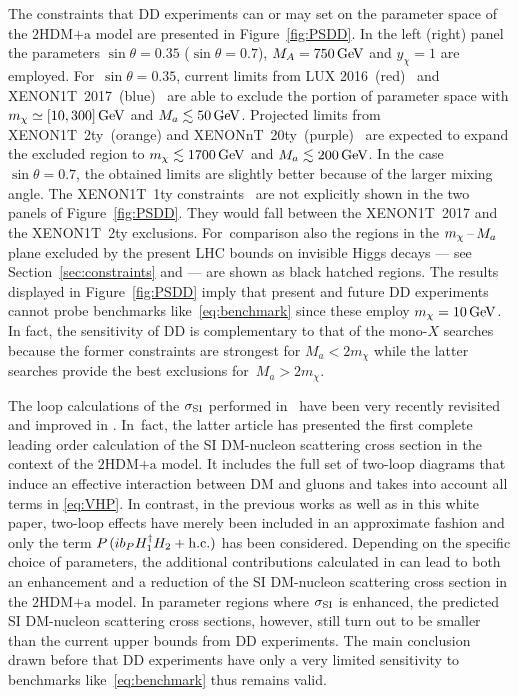 \documentclass[a4paper, 11pt,notoc]{article}
\newcommand{\hdma}{\ensuremath{\textrm{2HDM+a}}\xspace}
\begin{document}
The constraints that DD experiments can or may set on the parameter space of the \hdma model are presented in Figure~\ref{fig:PSDD}. In the left (right) panel the parameters $\sin \theta = 0.35$ ($\sin \theta = 0.7$), $M_A = 750 \, {\rm GeV}$ and $y_\chi = 1$ are employed. For~$\sin \theta = 0.35$,  current limits from LUX 2016~(red)~\cite{Akerib:2016vxi} and  XENON1T~2017~(blue)~\cite{Aprile:2017iyp} are able to exclude the portion of parameter space with $m_\chi \simeq [10, 300 ]\, {\rm GeV}$ and $M_a \lesssim 50 \, {\rm GeV}$. Projected limits from XENON1T~2ty~(orange) and XENONnT~20ty~(purple)~\cite{Aprile:2015uzo} are expected to expand the excluded region to $m_\chi \lesssim 1700 \, {\rm GeV}$ and $M_a \lesssim 200 \, {\rm GeV}$. In the case $\sin \theta = 0.7$, the obtained limits are slightly better because of the larger mixing angle.  The XENON1T~1ty constraints~\cite{Aprile:2018dbl} are not explicitly shown  in the two panels of Figure~\ref{fig:PSDD}. They would fall between the  XENON1T~2017 and the XENON1T~2ty exclusions. For~comparison also the regions in the $m_\chi \hspace{0.5mm}$--$\hspace{0.5mm} M_a$ plane excluded by the present  LHC bounds on invisible Higgs decays --- see Section~\ref{sec:constraints} and \cite{Bauer:2017ota} --- are shown as black hatched regions.  The results displayed in Figure~\ref{fig:PSDD} imply that present and future DD experiments cannot probe benchmarks like~\eqref{eq:benchmark} since these employ $m_\chi = 10 \, {\rm GeV}$. In fact, the sensitivity of DD is complementary to that of the mono-$X$ searches because the former constraints are strongest for $M_a < 2 m_\chi$ while the latter searches provide the best exclusions for~$M_a > 2 m_\chi$. 

The loop calculations of the $\sigma_{\rm SI}$ performed in~\cite{Ipek:2014gua,Arcadi:2017wqi,Sanderson:2018lmj,Li:2018qip} have been very recently revisited and improved in \cite{Abe:2018emu}.  In~fact, the latter article has presented the first complete leading order calculation of the SI DM-nucleon scattering cross section in the context of the \hdma model. It includes the full set of two-loop diagrams that induce an effective interaction between DM and gluons and takes into account all terms in \eqref{eq:VHP}. In contrast, in the previous works \cite{Ipek:2014gua,Arcadi:2017wqi,Sanderson:2018lmj,Li:2018qip}  as well as in this white paper, two-loop effects have merely been included in an approximate fashion and only the term $P  \hspace{0.5mm} ( i  b_P   H_1^\dagger H_2 + {\rm h.c.} )$ has been considered. Depending on the specific choice of parameters, the additional contributions calculated in \cite{Abe:2018emu} can lead to both an enhancement and a reduction of the SI DM-nucleon scattering cross section in the \hdma model. In parameter regions where $\sigma_{\rm SI}$ is enhanced, the predicted SI DM-nucleon scattering cross sections, however, still turn out to be smaller than the current upper bounds from DD experiments. The main conclusion drawn before that DD experiments have only a very limited sensitivity to benchmarks like~\eqref{eq:benchmark} thus remains valid.  
\end{document}
